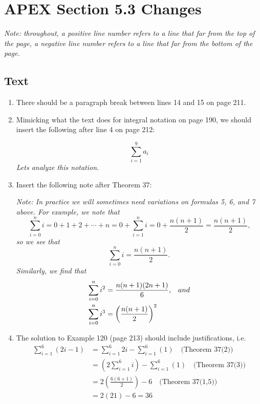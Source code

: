 \documentclass[11pt]{report}
\begin{document}
\chapter*{APEX Section 5.3 Changes}

{\slshape Note: throughout, a positive line number refers to a line that far from the top of the page, a negative line number refers to a line that far from the bottom of the page.}

\section*{Text}

\begin{enumerate}

\item There should be a paragraph break between lines 14 and 15 on page 211.

\item Mimicking what the text does for integral notation on page 190, we should insert the following after line 4 on page 212:

\emph{ \[\sum_{i=1}^9 a_i\] Lets analyze this notation.}

\item Insert the following note after Theorem 37:

{\slshape Note: In practice we will sometimes need variations on formulas 5, 6, and 7 above. For example, we note that \[\sum_{i=0}^n i=0+1+2+\cdots+n=0+\sum_{i=1}^n i=0+\frac{n(n+1)}{2}=\frac{n(n+1)}{2}\text{,}\] so we see that \[\sum_{i=0}^n i=\frac{n(n+1)}{2}.\] Similarly, we find that 
\begin{equation*}
\begin{split}
\sum_{i=0}^n i^2&=\frac{n(n+1)(2n+1)}{6}\text,{\quad and}\\
\sum_{i=0}^n i^3&=\left(\frac{n(n+1)}{2}\right)^2\\
\end{split}
\end{equation*}
}

\item The solution to Example 120 (page 213) should include justifications, i.e.
\begin{equation*}
\begin{split}
\sum_{i=1}^6 (2i-1)&=\sum_{i=1}^6 2i-\sum_{i=1}^6 (1) \quad \text{(Theorem 37(2))}\\
&=\left( 2\sum_{i=1}^6 i\right) -\sum_{i=1}^6 (1) \quad \text{(Theorem 37(3))}\\
&=2\left(\frac{6(6+1)}{2}\right)-6\quad \text{(Theorem 37(1,5))}\\
&=2(21)-6=36\\
\end{split}
\end{equation*}


\end{enumerate}
\end{document}

